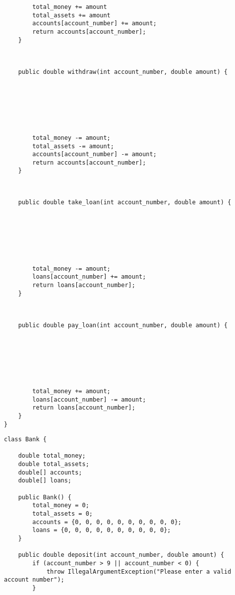 \begin{parts}
\begin{lstlisting}
        total_money += amount
        total_assets += amount
        accounts[account_number] += amount;
        return accounts[account_number];
    }
    
\end{lstlisting}
\begin{lstlisting}
 
    public double withdraw(int account_number, double amount) {







        total_money -= amount;
        total_assets -= amount;
        accounts[account_number] -= amount;
        return accounts[account_number];
    }
    
\end{lstlisting}
\begin{lstlisting}
 
    public double take_loan(int account_number, double amount) {







        total_money -= amount;
        loans[account_number] += amount;
        return loans[account_number];
    }
    
\end{lstlisting}
\pagebreak
\begin{lstlisting}
 
    public double pay_loan(int account_number, double amount) {







        total_money += amount;
        loans[account_number] -= amount;
        return loans[account_number];
    }
}

\end{lstlisting}
\fi

\begin{solution}
\begin{lstlisting}
class Bank {

    double total_money;
    double total_assets;
    double[] accounts;
    double[] loans;
    
    public Bank() {
        total_money = 0;
        total_assets = 0;
        accounts = {0, 0, 0, 0, 0, 0, 0, 0, 0, 0};
        loans = {0, 0, 0, 0, 0, 0, 0, 0, 0, 0};
    }

    public double deposit(int account_number, double amount) {
        if (account_number > 9 || account_number < 0) {
            throw IllegalArgumentException("Please enter a valid account number");
        }
        

\end{lstlisting}
\end{solution}
\end{parts}
